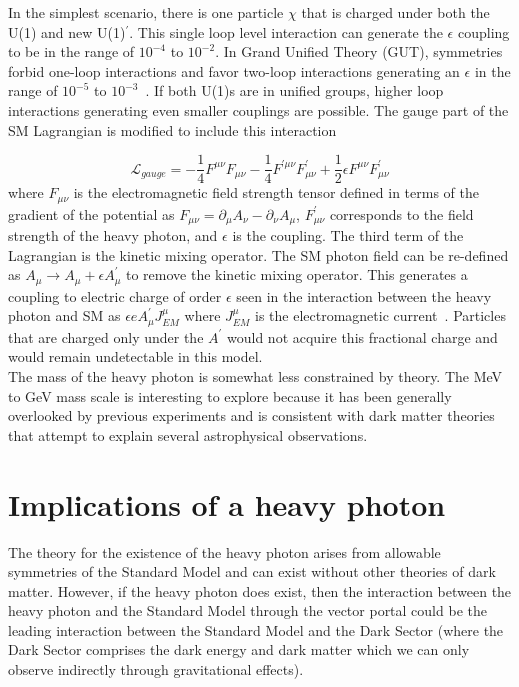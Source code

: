 In the simplest scenario, there is one particle $\chi$ that is charged under both the U(1) and new U(1)$^{\prime}$. This single loop level interaction can generate the $\epsilon$ coupling to be in the range of $10^{-4}$ to $10^{-2}$. In Grand Unified Theory (GUT), symmetries forbid one-loop interactions and favor two-loop interactions generating an $\epsilon$ in the range of $10^{-5}$ to $10^{-3}$~\cite{alexander_dark_2016}. If both U(1)s are in unified groups, higher loop interactions generating even smaller couplings are possible. The gauge part of the SM Lagrangian is modified to include this interaction

\begin{equation}
	\label{eq:lagrangian}
\mathcal{L}_{gauge} = -\dfrac{1}{4}F^{\mu\nu}F_{\mu\nu}-\dfrac{1}{4}
F^{\prime\mu\nu}F^{\prime}_{\mu\nu}+\dfrac{1}{2}\epsilon F^{\mu\nu}F^{\prime}_{\mu\nu}
\end{equation}
where $F_{\mu\nu}$ is the electromagnetic field strength tensor defined in terms of the gradient of the potential as $F_{\mu\nu}=\partial_{\mu}A_{\nu}-\partial_{\nu}A_{\mu}$, $F^{\prime}_{\mu\nu}$ corresponds to the field strength of the heavy photon, and $\epsilon$ is the coupling. The third term of the Lagrangian is the kinetic mixing operator. The SM photon field can be re-defined as $A_{\mu}\rightarrow A_{\mu}+\epsilon A^{\prime}_{\mu}$ to remove the kinetic mixing operator. This generates a coupling to electric charge of order $\epsilon$ seen in the interaction between the heavy photon and SM as $\epsilon e A^{\prime}_{\mu}J^{\mu}_{EM}$ where $J^{\mu}_{EM}$ is the electromagnetic current~\cite{bjorken_new_2009}. Particles that are charged only under the $A^{\prime}$ would not acquire this fractional charge and would remain undetectable in this model. \\
\indent The mass of the heavy photon is somewhat less constrained by theory. The MeV to GeV mass scale is interesting to explore because it has been generally overlooked by previous experiments and is consistent with dark matter theories that attempt to explain several astrophysical observations. 


\section{Implications of a heavy photon}
The theory for the existence of the heavy photon arises from allowable symmetries of the Standard Model and can exist without other theories of dark matter. However, if the heavy photon does exist, then the interaction between the heavy photon and the Standard Model through the vector portal could be  the leading interaction between the Standard Model and the Dark Sector (where the Dark Sector comprises the dark energy and dark matter which we can only observe indirectly through gravitational effects).

